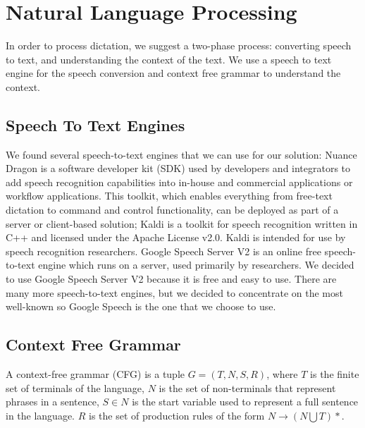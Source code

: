 \section{Natural Language Processing}
In order to process dictation, we suggest a two-phase process: converting speech to text, and understanding the context of the text. We use a speech to text engine for the speech conversion and context free grammar to understand the context.
\subsection{Speech To Text Engines}
We found several speech-to-text engines that we can use for our solution: Nuance Dragon \citet{Nuance14} is a software developer kit (SDK) used by developers and integrators to add speech recognition capabilities into in-house and commercial applications or workflow applications. This toolkit, which enables everything from free-text dictation to command and control functionality, can be deployed as part of a server or client-based solution; Kaldi \citet{PoveyASRU2011} is a toolkit for speech recognition written in C++ and licensed under the Apache License v2.0. Kaldi is intended for use by speech recognition researchers. Google Speech Server V2 \citet{google15} is an online free speech-to-text engine which runs on a server, used primarily by researchers. We decided to use Google Speech Server V2 because it is free and easy to use. There are many more speech-to-text engines, but we decided to concentrate on the most well-known so Google Speech is the one that we choose to use.
\subsection{Context Free Grammar}
A context-free grammar (CFG) is a tuple $ G=(T,N,S,R) $, where $ T $ is the finite set of  terminals of the language, $ N $ is the set of non-terminals that represent phrases in a sentence, $ S \in N $ is the start variable used to represent a full sentence in the language. $ R $ is the set of production rules of the form $ N \rightarrow (N \bigcup T)* $.
